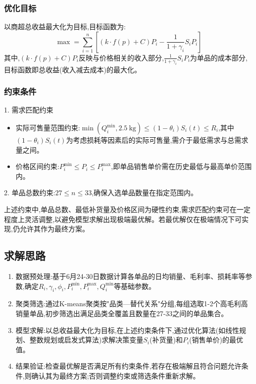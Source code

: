 \documentclass{cumcmthesis}
\begin{document}
\subsubsection{优化目标}
以商超总收益最大化为目标,目标函数为:
\[
\max = \sum_{i=1}^{n} \left[ (k \cdot f(p) + C) P_i - \frac{1}{1 + \gamma_i} S_i P_i \right]
\]
其中,\( (k \cdot f(p) + C) P_i \)反映与价格相关的收入部分,\( \frac{1}{1 + \gamma_i} S_i P_i \)为单品的成本部分,目标函数即总收益(收入减去成本)的最大化。

\subsubsection{约束条件}
1. 需求匹配约束
    \begin{itemize}
        \item 实际可售量范围约束:\( \min(Q_i^{\min}, 2.5\ \text{kg}) \leq (1 - \theta_i) S_i(t) \leq R_i \),其中\( (1 - \theta_i) S_i(t) \)为考虑损耗等因素后的实际可售量,需介于最低需求与总需求量之间。
        \item 价格区间约束:\( P_i^{\min} \leq P_i \leq P_i^{\max} \),即单品销售单价需在历史最低与最高单价范围内。
    \end{itemize}
2. 单品总数约束:\( 27 \leq n \leq 33 \),确保入选单品数量在指定范围内。

上述约束中,单品总数、最低补货量及价格区间为硬性约束,需求匹配约束可在一定程度上灵活调整,以避免模型求解出现极端最优解。若最优解仅在极端情况下可实现,仍允许其作为最终方案。

\subsection{求解思路}
\begin{enumerate}[label=1.]
    \item 数据预处理:基于6月24-30日数据计算各单品的日均销量、毛利率、损耗率等参数,确定\( R_i, \gamma_i, \phi_i, P_i^{\min}, P_i^{\max}, Q_i^{\min} \)等基础参数。
    \item 聚类筛选:通过K-means聚类按"品类—替代关系"分组,每组选取1-2个高毛利高销量单品,初步筛选出满足品类全覆盖且数量在27-33之间的单品集合。
    \item 模型求解:以总收益最大化为目标,在上述约束条件下,通过优化算法(如线性规划、整数规划或启发式算法)求解决策变量\( S_i \)(补货量)和\( P_i \)(销售单价)的最优值。
    \item 结果验证:检查最优解是否满足所有约束条件,若存在极端解且符合问题允许条件,则确认其为最终方案;否则调整约束或筛选条件重新求解。
\end{enumerate}
\end{document}
